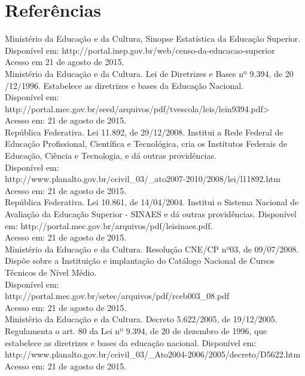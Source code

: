 \section{Referências}

Ministério da Educação e da Cultura, Sinopse Estatística da Educação Superior.\\
Disponível em: http://portal.inep.gov.br/web/censo-da-educacao-superior\\ Acesso em 21 de agosto de 2015.\\

Ministério da Educação e da Cultura. Lei de Diretrizes e Bases nº 9.394, de 20 /12/1996.  Estabelece as diretrizes e bases da Educação Nacional.\\ Disponível em:\\ http://portal.mec.gov.br/seed/arquivos/pdf/tvescola/leis/lein9394.pdf>\\
Acesso em: 21 de agosto de 2015.\\

República Federativa. Lei 11.892, de 29/12/2008. Institui a Rede Federal de Educação Profissional, Científica e Tecnológica, cria os Institutos Federais de Educação, Ciência e Tecnologia, e dá outras providências.\\
Disponível em:\\ http://www.planalto.gov.br/ccivil\_03/\_ato2007-2010/2008/lei/l11892.htm\\ Acesso em: 21 de agosto de 2015.\\

República Federativa. Lei 10.861, de 14/04/2004. Institui o Sistema Nacional de Avaliação da Educação Superior - SINAES e dá outras providências. Disponível em: http://portal.mec.gov.br/arquivos/pdf/leisinaes.pdf.\\
Acesso em: 21 de agosto de 2015.\\

Ministério da Educação e da Cultura. Resolução CNE/CP nº03, de 09/07/2008. Dispõe sobre a Instituição e implantação do Catálogo Nacional de Cursos Técnicos de Nível Médio.\\
Disponível em:\\ http://portal.mec.gov.br/setec/arquivos/pdf/rceb003\_08.pdf\\
Acesso em: 21 de agosto de 2015.\\

Ministério da Educação e da Cultura. Decreto 5.622/2005, de 19/12/2005. Regulamenta o art. 80 da Lei nº 9.394, de 20 de dezembro de 1996, que estabelece as diretrizes e bases da educação nacional. 
Disponível em:\\ http://www.planalto.gov.br/ccivil\_03/\_Ato2004-2006/2005/decreto/D5622.htm\\Acesso em: 21 de agosto de 2015.\\

